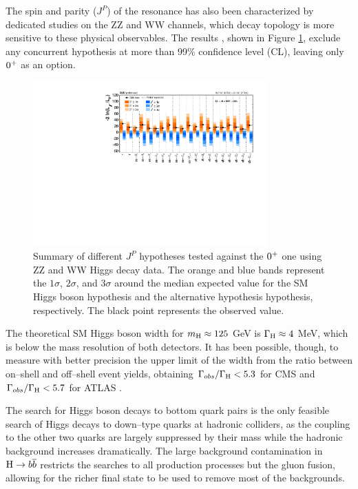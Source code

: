 The spin and parity ($J^P$) of the resonance has also been characterized by dedicated studies on the ZZ and WW channels, which decay topology is more sensitive to these physical observables. The results \cite{CMS:2014gga}, shown in Figure \ref{fig:hjp}, exclude any concurrent hypothesis at more than 99\% confidence level (CL), leaving only $0^{+}$ as an option.

\begin{figure}
        \centering
	\includegraphics[width=0.8\textwidth]{1_Introduction_Th_and_Exp/pics/hwwhzz_JP_SummaryPlot.pdf}
       \caption{Summary of different $J^P$ hypotheses tested against the $0^{+}$ one using ZZ and WW Higgs decay data. The orange and blue bands represent the $1\sigma$, $2\sigma$, and $3\sigma$ around the median expected value for the SM Higgs boson hypothesis and the alternative hypothesis hypothesis, respectively. The black point represents the observed value. }
       \label{fig:hjp}
\end{figure}

The theoretical SM Higgs boson width for $m_{\mathrm{H}} \approx 125$ GeV is $\Gamma_{\mathrm{H}} \approx 4$ MeV, which is below the mass resolution of both detectors. It has been possible, though, to measure with better precision the upper limit of the width from the ratio between on--shell and off--shell event yields, obtaining $\Gamma_{obs} / \Gamma_{\mathrm{H}} < 5.3$ for CMS \cite{Khachatryan:2014iha} and $\Gamma_{obs} / \Gamma_{\mathrm{H}} < 5.7$ for ATLAS \cite{ATLASCONF:2014042}. 

The search for Higgs boson decays to bottom quark pairs is the only feasible search of Higgs decays to down--type quarks at hadronic colliders, as the coupling to the other two quarks are largely suppressed by their mass while the hadronic background increases dramatically. The large background contamination in $\mathrm{H}\rightarrow b\overline{b}$ restricts the searches to all production processes but the gluon fusion, allowing for the richer final state to be used to remove most of the backgrounds.

